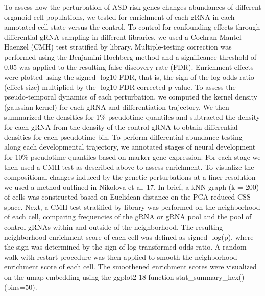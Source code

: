 To assess how the perturbation of ASD risk genes changes abundances of different organoid cell populations, we tested for enrichment of each gRNA in each annotated cell state versus the control. To control for confounding effects through differential gRNA sampling in different libraries, we used a Cochran-Mantel-Haenzel (CMH) test stratified by library. Multiple-testing correction was performed using the Benjamini-Hochberg method and a significance threshold of 0.05 was applied to the resulting false discovery rate (FDR). Enrichment effects were plotted using the signed -log10 FDR, that is, the sign of the log odds ratio (effect size) multiplied by the -log10 FDR-corrected p-value. To assess the pseudo-temporal dynamics of each perturbation, we computed the kernel density (gaussian kernel) for each gRNA and differentiation trajectory. We then summarized the densities for 1\% pseudotime quantiles and subtracted the density for each gRNA from the density of the control gRNA to obtain differential densities for each pseudotime bin. To perform differential abundance testing along each developmental trajectory, we annotated stages of neural development for 10\% pseudotime quantiles based on marker gene expression. For each stage we then used a CMH test as described above to assess enrichment. To visualize the compositional changes induced by the genetic perturbations at a finer resolution we used a method outlined in Nikolova et al. 17. In brief, a kNN graph (k = 200) of cells was constructed based on Euclidean distance on the PCA-reduced CSS space. Next, a CMH test stratified by library was performed on the neighborhood of each cell, comparing frequencies of the gRNA or gRNA pool and the pool of control gRNAs within and outside of the neighborhood. The resulting neighborhood enrichment score of each cell was defined as signed -log(p), where the sign was determined by the sign of log-transformed odds ratio. A random walk with restart procedure was then applied to smooth the neighborhood enrichment score of each cell. The smoothened enrichment scores were visualized on the umap embedding using the ggplot2 18 function stat\_summary\_hex() (bins=50).

